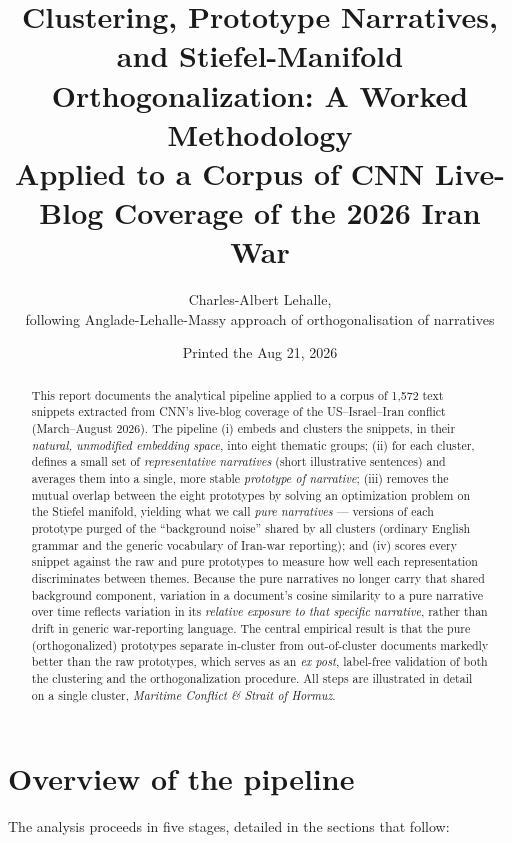 \documentclass[11pt]{article}
\title{\textbf{Clustering, Prototype Narratives, and Stiefel-Manifold\\
Orthogonalization: A Worked Methodology}\\[4pt]
\large Applied to a Corpus of CNN Live-Blog Coverage of the 2026 Iran War}
\author{Charles-Albert Lehalle,\\[.2em] following Anglade-Lehalle-Massy approach of orthogonalisation of narratives}
\date{Printed the Aug 21, 2026}
\begin{document}
\maketitle
\thispagestyle{fancy}

\begin{abstract}
\noindent This report documents the analytical pipeline applied to a corpus of
1{,}572 text snippets extracted from CNN's live-blog coverage of the
US--Israel--Iran conflict (March--August 2026). The pipeline (i) embeds and
clusters the snippets, in their \emph{natural, unmodified embedding space},
into eight thematic groups; (ii) for each cluster, defines a small set of
\emph{representative narratives} (short illustrative sentences) and averages
them into a single, more stable \emph{prototype of narrative}; (iii) removes
the mutual overlap between the eight prototypes by solving an optimization
problem on the Stiefel manifold, yielding what we call \emph{pure
narratives} --- versions of each prototype purged of the ``background
noise'' shared by all clusters (ordinary English grammar and the generic
vocabulary of Iran-war reporting); and (iv) scores every snippet against
the raw and pure prototypes to measure how well each representation
discriminates between themes. Because the pure narratives no longer carry
that shared background component, variation in a document's cosine
similarity to a pure narrative over time reflects variation in its
\emph{relative exposure to that specific narrative}, rather than drift in
generic war-reporting language. The central empirical result is that the
pure (orthogonalized) prototypes separate in-cluster from out-of-cluster
documents markedly better than the raw prototypes, which serves as an
\emph{ex post}, label-free validation of both the clustering and the
orthogonalization procedure. All steps are illustrated in detail on a
single cluster, \textit{Maritime Conflict \& Strait of Hormuz}.
\end{abstract}

\section{Overview of the pipeline}

The analysis proceeds in five stages, detailed in the sections that follow:
\end{document}
